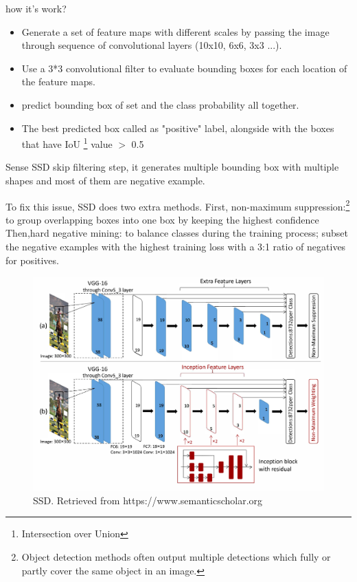 \documentclass[12pt]{report}
\begin{document}
                    how it's work?
                    \begin{itemize}
                        \item Generate a set of feature maps with different scales 
                        by passing the image through sequence of convolutional layers (10x10, 6x6, 3x3 ...).
                        \item Use a 3*3 convolutional filter to evaluate bounding boxes for each location of the feature maps.
                        \item predict bounding box of set and the class probability all together.
                        \item The best predicted box called as "positive" label, alongside with
                        the boxes that have IoU \footnote{Intersection over Union } value $>$ 0.5 
                    \end{itemize}
                    Sense SSD skip filtering step, it generates multiple bounding box with multiple shapes
                    and most of them are negative example.

                    To fix this issue, SSD does two extra methods.
                    First, non-maximum suppression:\footnote{Object detection methods often output multiple detections which fully or partly cover the same object in an image.}
                    to group overlapping boxes into one box by keeping the highest confidence
                    Then,hard negative mining: to balance classes during the training process; subset the negative examples 
                    with the highest training loss with a 3:1 ratio of negatives for positives.

                    \begin{figure}[h]
                    \centering
                    \includegraphics[width=.7\textwidth]{./images/ssd.png}
                    \caption{SSD. Retrieved from https://www.semanticscholar.org}
                    \label{fig:frcnn}
                    \end{figure} 
\end{document}
